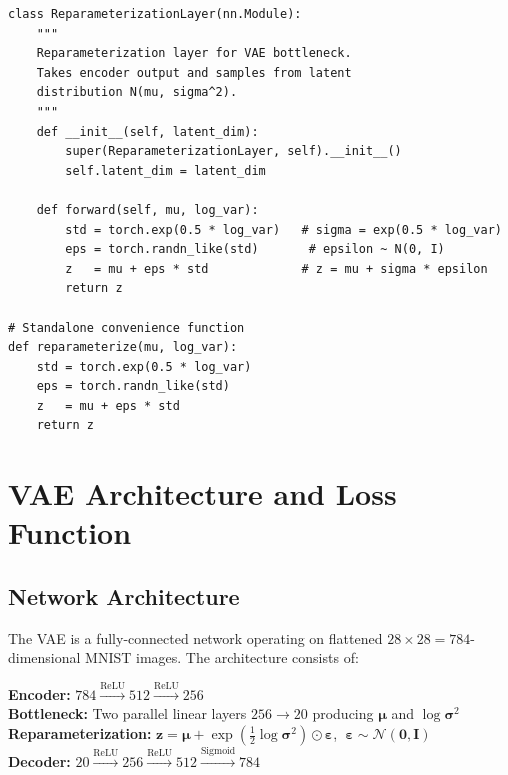 \documentclass[12pt,a4paper]{article}
\begin{document}
\begin{lstlisting}[style=pythonstyle, caption={Reparameterization Layer and Function (VAE\_MNIST.ipynb -- Cell 7)}, label={lst:reparam}]
class ReparameterizationLayer(nn.Module):
    """
    Reparameterization layer for VAE bottleneck.
    Takes encoder output and samples from latent
    distribution N(mu, sigma^2).
    """
    def __init__(self, latent_dim):
        super(ReparameterizationLayer, self).__init__()
        self.latent_dim = latent_dim

    def forward(self, mu, log_var):
        std = torch.exp(0.5 * log_var)   # sigma = exp(0.5 * log_var)
        eps = torch.randn_like(std)       # epsilon ~ N(0, I)
        z   = mu + eps * std             # z = mu + sigma * epsilon
        return z

# Standalone convenience function
def reparameterize(mu, log_var):
    std = torch.exp(0.5 * log_var)
    eps = torch.randn_like(std)
    z   = mu + eps * std
    return z
\end{lstlisting}

\section{VAE Architecture and Loss Function}

\subsection{Network Architecture}

The VAE is a fully-connected network operating on flattened $28 \times 28 = 784$-dimensional MNIST images. The architecture consists of:

\textbf{Encoder:} $784 \xrightarrow{\text{ReLU}} 512 \xrightarrow{\text{ReLU}} 256$ \\
\textbf{Bottleneck:} Two parallel linear layers $256 \rightarrow 20$ producing $\boldsymbol{\mu}$ and $\log\boldsymbol{\sigma}^2$ \\
\textbf{Reparameterization:} $\mathbf{z} = \boldsymbol{\mu} + \exp(\frac{1}{2}\log\boldsymbol{\sigma}^2)\odot\boldsymbol{\varepsilon}$, $\;\boldsymbol{\varepsilon}\sim\mathcal{N}(\mathbf{0},\mathbf{I})$ \\
\textbf{Decoder:} $20 \xrightarrow{\text{ReLU}} 256 \xrightarrow{\text{ReLU}} 512 \xrightarrow{\text{Sigmoid}} 784$
\end{document}

